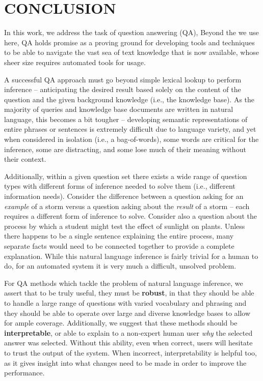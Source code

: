 \chapter{CONCLUSION\label{chapter:conclusion}}


In this work, we address the task of question answering (QA),   Beyond the  we use here, QA holds promise as a proving ground for developing tools and techniques to be able to navigate the vast sea of text knowledge that is now available, whose sheer size requires automated tools for usage.  

A successful QA approach must go beyond simple lexical lookup to perform inference -- anticipating the desired result based solely on the content of the question and the given background knowledge (i.e., the knowledge base).  As the majority of queries and knowledge base documents are written in natural language, this becomes a bit tougher --  
developing semantic representations of entire phrases or sentences is extremely difficult due to language variety, and yet when considered in isolation (i.e., a bag-of-words), some words are critical for the inference, some are distracting, and some lose much of their meaning without their context.  

Additionally, within a given question set there exists a wide range of question types with different forms of inference needed to solve them (i.e., different information needs).  Consider the difference between a question asking for an \textit{example} of a storm versus a question asking about the \textit{result} of a storm -- each requires a different form of inference to solve.  Consider also a question about the process by which a student might test the effect of sunlight on plants.  Unless there happens to be a single sentence explaining the entire process, many separate facts would need to be connected together to provide a complete explanation.  While this natural language inference is fairly trivial for a human to do, for an automated system it is very much a difficult, unsolved problem.

For QA methods which tackle the problem of natural language inference, we assert that to be truly useful, they must be \textbf{robust}, in that they should be able to handle a large range of questions with varied vocabulary and phrasing and they should be able to operate over large and diverse knowledge bases to allow for ample coverage.  Additionally, we suggest that these methods should be \textbf{interpretable}, or able to explain to a non-expert human user \textit{why} the selected answer was selected.  Without this ability, even when correct, users will hesitate to trust the output of the system.  When incorrect, interpretability is helpful too, as it gives insight into what changes need to be made in order to improve the performance.


